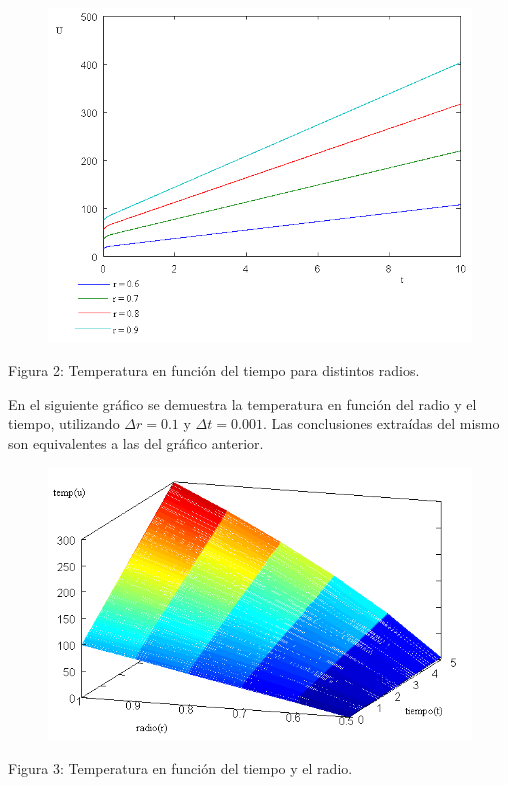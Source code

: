 ﻿\documentclass[%
final,
%
reprint,
%
notitlepage,
narroweqnarray,
inline,
twoside,
invited
]{ieee}
\begin{document}
\begin{figure}[H]
	\begin{center}
	\includegraphics[scale=0.33]{./img/r.png}
	\end{center}
\end{figure}
\begin{center}
\par Figura 2: Temperatura en función del tiempo para distintos radios.
\end{center}

En el siguiente gráfico se demuestra la temperatura en función del radio y el tiempo, utilizando $\Delta r = 0.1$ y 
$\Delta t = 0.001$. Las conclusiones extraídas del mismo son equivalentes a las del gráfico anterior.

\begin{figure}[H]
	\begin{center}
	\includegraphics[scale=0.4]{./img/mesh.png}
	\end{center}
\end{figure}
\begin{center}
\par Figura 3: Temperatura en función del tiempo y el radio.
\end{center}
\end{document}
